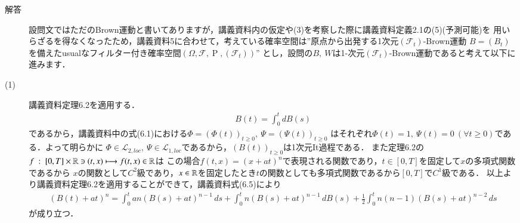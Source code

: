 \begin{description}
	\item[解答] 設問文ではただのBrown運動と書いてありますが，講義資料内の仮定や(3)を考察した際に講義資料定義2.1の(5)(予測可能)を
		用いらざるを得なくなったため，講義資料5に合わせて，考えている確率空間は''原点から出発する1次元$(\mathcal{F}_t)$-Brown運動
		$B = (B_t)$を備えたusualなフィルター付き確率空間$(\Omega, \mathcal{F}, \operatorname{P}, (\mathcal{F}_t))$''
		とし，設問の$B,\ W$は1-次元$(\mathcal{F}_t)$-Brown運動であると考えて以下に進みます．
	\item[(1)] 講義資料定理6.2を適用する．
		\begin{align}
			B(t) = \int_{0}^{t} dB(s)
		\end{align}
		であるから，講義資料中の式(6.1)における$\Phi = (\Phi(t))_{t \geq 0},\ \Psi = (\Psi(t))_{t \geq 0}$
		はそれぞれ$\Phi(t) = 1,\ \Psi(t) = 0\ (\forall t \geq 0)$である．よって明らかに
		$\Phi \in \mathcal{L}_{2,loc},\ \Psi \in \mathcal{L}_{1,loc}$であるから，$(B(t))_{t \geq 0}$は1次元It過程である．
		また定理6.2の$f\ :\ [0, T] \times \mathbb{R} \ni (t,x) \longmapsto f(t,x) \in \mathbb{R}$は
		この場合$f(t,x) = (x + at)^n$で表現される関数であり，$t \in [0,T]$を固定して$x$の多項式関数であるから
		$x$の関数として$C^2$級であり，$x \in \mathbb{R}$を固定したとき$t$の関数としても多項式関数であるから$[0, T]$で$C^1$級である．
		以上より講義資料定理6.2を適用することができて，講義資料式(6.5)により
		\begin{align}
			\left(B(t) + at\right)^n = %
			\int_{0}^{t} an(B(s) + at)^{n-1}\, ds
				+ \int_{0}^{t} n(B(s) + at)^{n-1}\, dB(s)
				+ \frac{1}{2} \int_{0}^{t} n(n-1)(B(s) + at)^{n-2}\, ds
		\end{align}
		が成り立つ．
	

\end{description}
